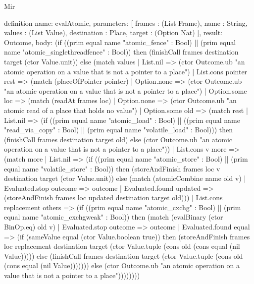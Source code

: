 \begin{lexlean}{Mir}
\begin{semanticmodule}
definition{
  name: evalAtomic,
  parameters: [
    frames : (List Frame),
    name : String,
    values : (List Value),
    destination : Place,
    target : (Option Nat)
  ],
  result: Outcome,
  body: (if ((prim equal name "atomic_fence" : Bool) || (prim equal name "atomic_singlethreadfence" : Bool)) then (finishCall frames destination target (ctor Value.unit)) else (match values
    | List.nil => (ctor Outcome.ub "an atomic operation on a value that is not a pointer to a place")
    | List.cons pointer rest => (match (placeOfPointer pointer)
      | Option.none => (ctor Outcome.ub "an atomic operation on a value that is not a pointer to a place")
      | Option.some loc => (match (readAt frames loc)
        | Option.none => (ctor Outcome.ub "an atomic read of a place that holds no value")
        | Option.some old => (match rest
          | List.nil => (if ((prim equal name "atomic_load" : Bool) || ((prim equal name "read_via_copy" : Bool) || (prim equal name "volatile_load" : Bool))) then (finishCall frames destination target old) else (ctor Outcome.ub "an atomic operation on a value that is not a pointer to a place"))
          | List.cons v more => (match more
            | List.nil => (if ((prim equal name "atomic_store" : Bool) || (prim equal name "volatile_store" : Bool)) then (storeAndFinish frames loc v destination target (ctor Value.unit)) else (match (atomicCombine name old v)
              | Evaluated.stop outcome => outcome
              | Evaluated.found updated => (storeAndFinish frames loc updated destination target old)))
            | List.cons replacement others => (if ((prim equal name "atomic_cxchg" : Bool) || (prim equal name "atomic_cxchgweak" : Bool)) then (match (evalBinary (ctor BinOp.eq) old v)
              | Evaluated.stop outcome => outcome
              | Evaluated.found equal => (if (sameValue equal (ctor Value.boolean true)) then (storeAndFinish frames loc replacement destination target (ctor Value.tuple (cons old (cons equal (nil Value))))) else (finishCall frames destination target (ctor Value.tuple (cons old (cons equal (nil Value))))))) else (ctor Outcome.ub "an atomic operation on a value that is not a pointer to a place"))))))))
}


\end{semanticmodule}
\end{lexlean}
